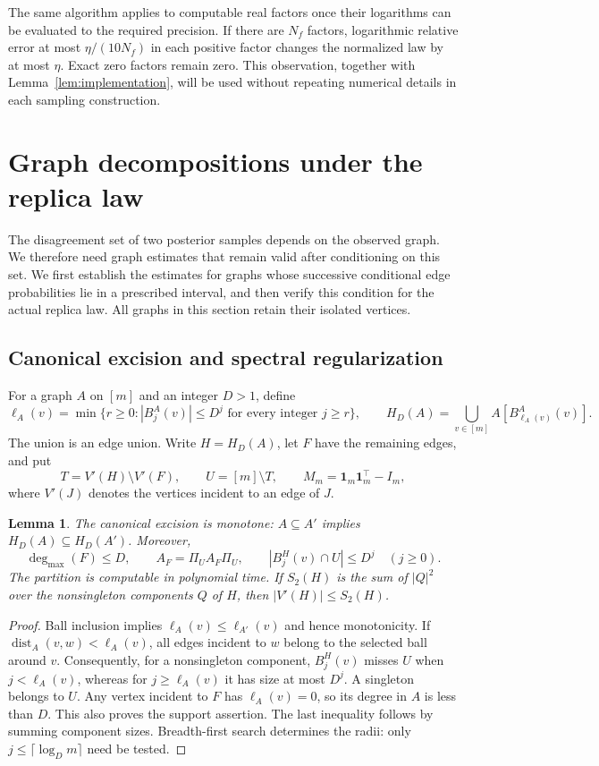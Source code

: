 \documentclass[11pt]{article}
\newtheorem{lemma}[thm]{Lemma}
\numberwithin{equation}{section}
\begin{document}
The same algorithm applies to computable real factors once their logarithms can be evaluated to the required precision. If there are $N_f$ factors, logarithmic relative error at most $\eta/(10N_f)$ in each positive factor changes the normalized law by at most $\eta$. Exact zero factors remain zero. This observation, together with Lemma~\ref{lem:implementation}, will be used without repeating numerical details in each sampling construction.


\section{Graph decompositions under the replica law}\label{tp:graphs}

The disagreement set of two posterior samples depends on the observed graph. We therefore need graph estimates that remain valid after conditioning on this set. We first establish the estimates for graphs whose successive conditional edge probabilities lie in a prescribed interval, and then verify this condition for the actual replica law. All graphs in this section retain their isolated vertices.

\subsection{Canonical excision and spectral regularization}

For a graph $A$ on $[m]$ and an integer $D>1$, define
\[
 \ell_A(v)=\min\{r\ge0:|B_j^A(v)|\le D^j\text{ for every integer }j\ge r\},
 \qquad H_D(A)=\bigcup_{v\in[m]} A[B_{\ell_A(v)}^A(v)].
\]
The union is an edge union. Write $H=H_D(A)$, let $F$ have the remaining edges, and put
\[
 T=V'(H)\setminus V'(F),\qquad U=[m]\setminus T,
 \qquad M_m=\boldsymbol 1_m\boldsymbol 1_m^\top-I_m,
\]
where $V'(J)$ denotes the vertices incident to an edge of $J$.

\begin{lemma}\label{tp:deterministic}
The canonical excision is monotone: $A\subseteq A'$ implies $H_D(A)\subseteq H_D(A')$. Moreover,
\[
 \deg_{\max}(F)\le D,\qquad A_F=\Pi_UA_F\Pi_U,
 \qquad |B_j^H(v)\cap U|\le D^j\quad(j\ge0).
\]
The partition is computable in polynomial time. If $S_2(H)$ is the sum of $|Q|^2$ over the nonsingleton components $Q$ of $H$, then $|V'(H)|\le S_2(H)$.
\end{lemma}
\begin{proof}
Ball inclusion implies $\ell_A(v)\le\ell_{A'}(v)$ and hence monotonicity. If $\operatorname{dist}_A(v,w)<\ell_A(v)$, all edges incident to $w$ belong to the selected ball around $v$. Consequently, for a nonsingleton component, $B_j^H(v)$ misses $U$ when $j<\ell_A(v)$, whereas for $j\ge\ell_A(v)$ it has size at most $D^j$. A singleton belongs to $U$. Any vertex incident to $F$ has $\ell_A(v)=0$, so its degree in $A$ is less than $D$. This also proves the support assertion. The last inequality follows by summing component sizes. Breadth-first search determines the radii: only $j\le\lceil\log_Dm\rceil$ need be tested.
\end{proof}
\end{document}
